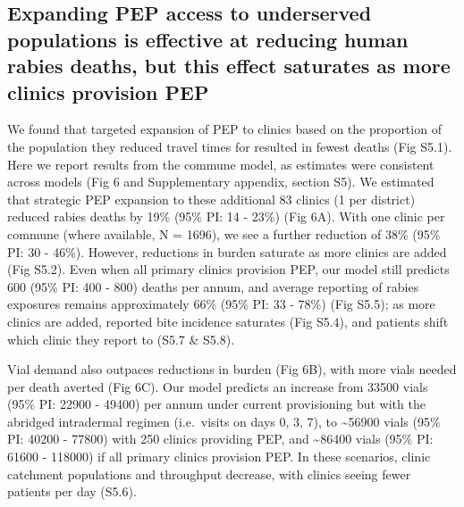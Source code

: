 \documentclass[
]{book}
\begin{document}
\hypertarget{expanding-pep-access-to-underserved-populations-is-effective-at-reducing-human-rabies-deaths-but-this-effect-saturates-as-more-clinics-provision-pep}{%
\subsection{Expanding PEP access to underserved populations is effective at reducing human rabies deaths, but this effect saturates as more clinics provision PEP}\label{expanding-pep-access-to-underserved-populations-is-effective-at-reducing-human-rabies-deaths-but-this-effect-saturates-as-more-clinics-provision-pep}}

We found that targeted expansion of PEP to clinics based on the
proportion of the population they reduced travel times for resulted in
fewest deaths (Fig S5.1). Here we report results from the commune model,
as estimates were consistent across models (Fig 6 and Supplementary
appendix, section S5). We estimated that strategic PEP expansion to
these additional 83 clinics (1 per district) reduced rabies deaths by
19\% (95\% PI: 14 - 23\%) (Fig 6A). With one clinic per commune (where
available, N = 1696), we see a further reduction of 38\% (95\% PI: 30 -
46\%). However, reductions in burden saturate as more clinics are added
(Fig S5.2). Even when all primary clinics provision PEP, our model still
predicts 600 (95\% PI: 400 - 800) deaths per annum, and average reporting
of rabies exposures remains approximately 66\% (95\% PI: 33 - 78\%) (Fig
S5.5); as more clinics are added, reported bite incidence saturates (Fig
S5.4), and patients shift which clinic they report to (S5.7 \& S5.8).

Vial demand also outpaces reductions in burden (Fig 6B), with more vials
needed per death averted (Fig 6C). Our model predicts an increase from
33500 vials (95\% PI: 22900 - 49400) per annum under current provisioning
but with the abridged intradermal regimen (i.e.~visits on days 0, 3, 7),
to \textasciitilde56900 vials (95\% PI: 40200 - 77800) with 250 clinics providing PEP,
and \textasciitilde86400 vials (95\% PI: 61600 - 118000) if all primary clinics
provision PEP. In these scenarios, clinic catchment populations and
throughput decrease, with clinics seeing fewer patients per day (S5.6).
\end{document}
